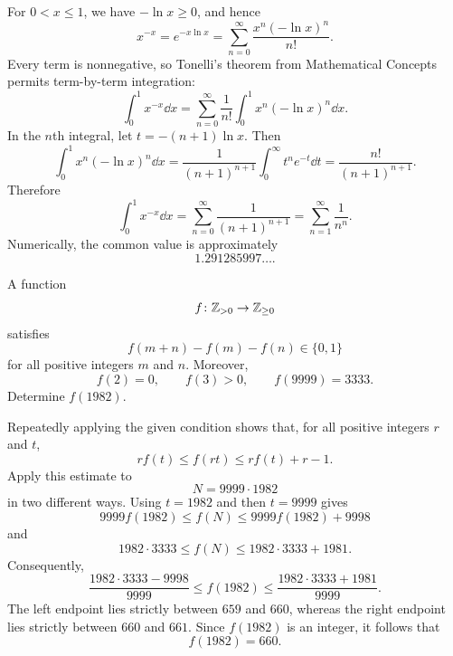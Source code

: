     \begin{solution}
        For $0<x\leq1$, we have $-\ln x\geq0$, and hence
        \[
            x^{-x}
            =
            e^{-x\ln x}
            =
            \sum_{n=0}^{\infty}
            \frac{x^n(-\ln x)^n}{n!}.
        \]
        Every term is nonnegative, so Tonelli's theorem from Mathematical
        Concepts permits term-by-term integration:
        \[
            \int_0^1x^{-x}\dd x
            =
            \sum_{n=0}^{\infty}
            \frac{1}{n!}
            \int_0^1x^n(-\ln x)^n\dd x.
        \]
        In the $n$th integral, let $t=-(n+1)\ln x$. Then
        \[
            \int_0^1x^n(-\ln x)^n\dd x
            =
            \frac{1}{(n+1)^{n+1}}
            \int_0^\infty t^ne^{-t}\dd t
            =
            \frac{n!}{(n+1)^{n+1}}.
        \]
        Therefore
        \[
            \int_0^1x^{-x}\dd x
            =
            \sum_{n=0}^{\infty}\frac{1}{(n+1)^{n+1}}
            =
            \boxed{\sum_{n=1}^{\infty}\frac{1}{n^n}}.
        \]
        Numerically, the common value is approximately
        \[
            1.291285997\ldots.
        \]
    \end{solution}

    \begin{expectedproblem}[1982 IMO]
        A function
        \[
            f\colon\mathbb{Z}_{>0}\to\mathbb{Z}_{\geq0}
        \]
        satisfies
        \[
            f(m+n)-f(m)-f(n)\in\{0,1\}
        \]
        for all positive integers $m$ and $n$. Moreover,
        \[
            f(2)=0,
            \qquad
            f(3)>0,
            \qquad
            f(9999)=3333.
        \]
        Determine $f(1982)$.
    \end{expectedproblem}

    \begin{solution}
        Repeatedly applying the given condition shows that, for all positive
        integers $r$ and $t$,
        \[
            r f(t)
            \leq
            f(rt)
            \leq
            r f(t)+r-1.
        \]
        Apply this estimate to
        \[
            N=9999\cdot1982
        \]
        in two different ways. Using $t=1982$ and then $t=9999$ gives
        \[
            9999f(1982)
            \leq
            f(N)
            \leq
            9999f(1982)+9998
        \]
        and
        \[
            1982\cdot3333
            \leq
            f(N)
            \leq
            1982\cdot3333+1981.
        \]
        Consequently,
        \[
            \frac{1982\cdot3333-9998}{9999}
            \leq
            f(1982)
            \leq
            \frac{1982\cdot3333+1981}{9999}.
        \]
        The left endpoint lies strictly between $659$ and $660$, whereas the
        right endpoint lies strictly between $660$ and $661$. Since
        $f(1982)$ is an integer, it follows that
        \[
            \boxed{f(1982)=660}.
        \]
    \end{solution}

